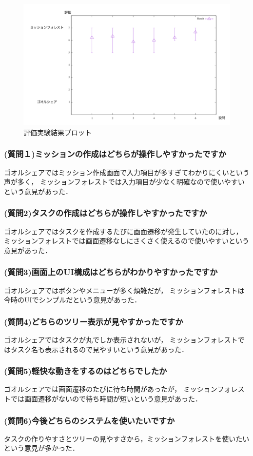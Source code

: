 \begin{figure}[t]
	\begin{center}
		\includegraphics[width=0.9\linewidth]{assets/img/experiment_result.png}
		\caption{評価実験結果プロット}
		\label{graph:experiment_result}
	\end{center}
\end{figure}

\subsubsection{(質問１)ミッションの作成はどちらが操作しやすかったですか}
ゴオルシェアではミッション作成画面で入力項目が多すぎてわかりにくいという声が多く，
ミッションフォレストでは入力項目が少なく明確なので使いやすいという意見があった．

\subsubsection{(質問2)タスクの作成はどちらが操作しやすかったですか}
ゴオルシェアではタスクを作成するたびに画面遷移が発生していたのに対し，
ミッションフォレストでは画面遷移なしにさくさく使えるので使いやすいという意見があった．

\subsubsection{(質問3)画面上のUI構成はどちらがわかりやすかったですか}
ゴオルシェアではボタンやメニューが多く煩雑だが，
ミッションフォレストは今時のUIでシンプルだという意見があった．

\subsubsection{(質問4)どちらのツリー表示が見やすかったですか}
ゴオルシェアではタスクが丸でしか表示されないが，
ミッションフォレストではタスク名も表示されるので見やすいという意見があった．

\subsubsection{(質問5)軽快な動きをするのはどちらでしたか}
ゴオルシェアでは画面遷移のたびに待ち時間があったが，
ミッションフォレストでは画面遷移がないので待ち時間が短いという意見があった．

\subsubsection{(質問6)今後どちらのシステムを使いたいですか}
タスクの作りやすさとツリーの見やすさから，ミッションフォレストを使いたいという意見が多かった．
